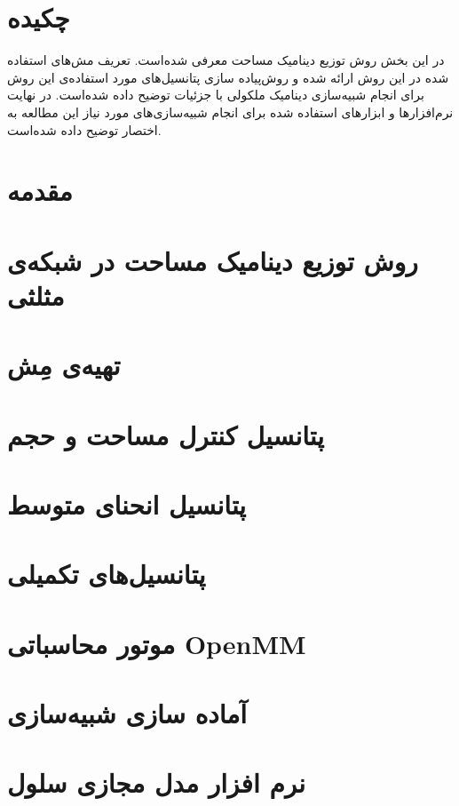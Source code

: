 \setRL
\clearpage
\def \MemMethod {\Mempath /MembraneMethod}

\section{
چکیده
}
در این بخش روش توزیع دینامیک مساحت معرفی شده‌است. تعریف مش‌های استفاده شده در این روش ارائه شده و روش‌پیاده سازی پتانسیل‌های مورد استفاده‌ی این روش برای انجام شبیه‌سازی دینامیک ملکولی با جزئیات توضیح داده شده‌است. در نهایت نرم‌افزار‌ها و ابزارهای استفاده شده برای انجام شبیه‌سازی‌های مورد نیاز این مطالعه به اختصار توضیح داده شده‌است.

\section{
مقدمه
}



\section{
روش توزیع دینامیک مساحت در شبکه‌ی مثلثی
}


\section{
تهیه‌ی مِش
}


\section{
پتانسیل کنترل مساحت و حجم
}


\section{
پتانسیل انحنای متوسط
}



\section{
پتانسیل‌های تکمیلی
\label{sec:auxPotentials}
}




\section{
موتور محاسباتی
OpenMM
}


\section{
آماده سازی شبیه‌سازی
}


\section{
نرم افزار مدل مجازی سلول
}




